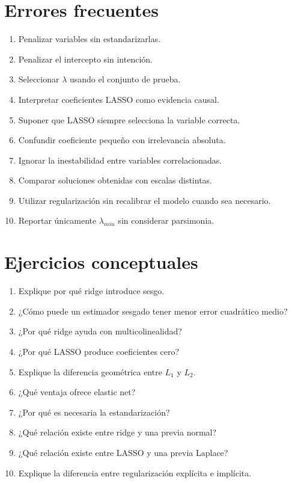 \documentclass[
  spanish,
  10.5pt,
  letterpaper,
  DIV=11,
  numbers=noendperiod,
  oneside,
  open=any]{scrreprt}
\providecommand{\tightlist}{%
  \setlength{\itemsep}{0pt}\setlength{\parskip}{0pt}}
\theoremstyle{definition}
\theoremstyle{definition}
\theoremstyle{plain}
\theoremstyle{remark}
\begin{document}
\section*{Errores frecuentes}\label{errores-frecuentes-7}


\begin{enumerate}
\def\labelenumi{\arabic{enumi}.}
\tightlist
\item
  Penalizar variables sin estandarizarlas.
\item
  Penalizar el intercepto sin intención.
\item
  Seleccionar \(\lambda\) usando el conjunto de prueba.
\item
  Interpretar coeficientes LASSO como evidencia causal.
\item
  Suponer que LASSO siempre selecciona la variable correcta.
\item
  Confundir coeficiente pequeño con irrelevancia absoluta.
\item
  Ignorar la inestabilidad entre variables correlacionadas.
\item
  Comparar soluciones obtenidas con escalas distintas.
\item
  Utilizar regularización sin recalibrar el modelo cuando sea necesario.
\item
  Reportar únicamente \(\lambda_{min}\) sin considerar parsimonia.
\end{enumerate}

\section*{Ejercicios conceptuales}\label{ejercicios-conceptuales-7}


\begin{enumerate}
\def\labelenumi{\arabic{enumi}.}
\tightlist
\item
  Explique por qué ridge introduce sesgo.
\item
  ¿Cómo puede un estimador sesgado tener menor error cuadrático medio?
\item
  ¿Por qué ridge ayuda con multicolinealidad?
\item
  ¿Por qué LASSO produce coeficientes cero?
\item
  Explique la diferencia geométrica entre \(L_1\) y \(L_2\).
\item
  ¿Qué ventaja ofrece elastic net?
\item
  ¿Por qué es necesaria la estandarización?
\item
  ¿Qué relación existe entre ridge y una previa normal?
\item
  ¿Qué relación existe entre LASSO y una previa Laplace?
\item
  Explique la diferencia entre regularización explícita e implícita.
\end{enumerate}
\end{document}

